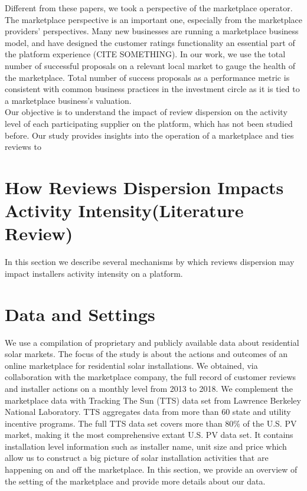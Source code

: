 \documentclass[msom,blindrev]{informs3}
\begin{document}
Different from these papers, we took a perspective of the marketplace operator. The marketplace perspective is an important one, especially from the marketplace providers' perspectives. Many new businesses are running a marketplace business model, and have designed the customer ratings functionality an essential part of the platform experience (CITE SOMETHING). In our work, we use the total number of successful proposals on a relevant local market to gauge the health of the marketplace. Total number of success proposals as a performance metric is consistent with common business practices in the investment circle \citep{boris_2018,galston_2017} as it is tied to a marketplace business's valuation. \\

Our objective is to understand the impact of review dispersion on the activity level of each participating supplier on the platform, which has not been studied before. Our study provides insights into the operation of a marketplace and ties reviews to



\section{How Reviews Dispersion Impacts Activity Intensity(Literature Review) }
 In this section we describe several mechanisms by which reviews dispersion may impact installers activity intensity on a platform.
\section{Data and Settings}
We use a compilation of proprietary and publicly available data about residential solar markets. The focus of the study is about the actions and outcomes of an online marketplace for residential solar installations. We obtained, via collaboration with the marketplace company, the full record of customer reviews and installer actions on a monthly level from 2013 to 2018. We complement the marketplace data with Tracking The Sun (TTS) data set from Lawrence Berkeley National Laboratory. TTS aggregates data from more than 60 state and utility incentive programs. The full TTS data set covers more than 80\% of the U.S. PV
market, making it the most comprehensive extant U.S. PV data set. It contains installation level information such as installer name, unit size and price which allow us to construct a big picture of solar installation activities that are happening on and off the marketplace. In this section, we provide an overview of the setting of the marketplace and provide more details about our data.
\end{document}
